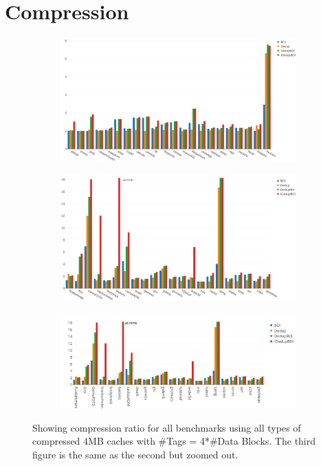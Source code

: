 \section{Compression}
\label{sec:Compression}
\begin{figure}
    \begin{subfigure}{\textwidth}
        \includegraphics[width=\textwidth]{all-compratio1.png}
    \end{subfigure}
    \begin{subfigure}{\textwidth}
        \includegraphics[width=\textwidth]{all-compratio2.png}
    \end{subfigure}
    \begin{subfigure}{\textwidth}
        \includegraphics[width=\textwidth]{all-compratio3.png}
    \end{subfigure}
    \caption[All benchmarks: Compression]{Showing compression ratio for all benchmarks using all types of compressed 4MB caches with \#Tags = 4*\#Data Blocks. The third figure is the same as the second but zoomed out.}
    \label{fig:all_compratio}
\end{figure}

